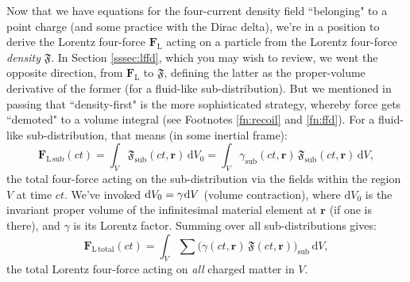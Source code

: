 \documentclass[12pt]{article}
\renewcommand{\vv}[1]{\mathbf{#1}}
\newcommand{\dd}[1]{\mathrm{d}#1}
\begin{document}
Now that we have equations for the four-current density field ``belonging" to a point charge (and some practice with the Dirac delta), we're in a position to derive the Lorentz four-force $\vv F_{\mathrm{L}}$ acting on a particle from the Lorentz four-force \emph{density} $\bm{\mathfrak{F}}$. In Section \ref{sssec:lffd}, which you may wish to review, we went the opposite direction, from $\vv F_{\mathrm{L}}$ to $\bm{\mathfrak{F}}$, defining the latter as the proper-volume derivative of the former (for a fluid-like sub-distribution). But we mentioned in passing that ``density-first" is the more sophisticated strategy, whereby force gets ``demoted" to a volume integral (see Footnotes \ref{fn:recoil} and \ref{fn:ffd}). For a fluid-like sub-distribution, that means (in some inertial frame):
\begin{equation*}
\vv F_{\mathrm{L \, sub}} (ct) = \int_{V} \bm{\mathfrak{F}}_{\mathrm{sub}} (ct, \vv r) \, \dd V_0 = \int_{V} \gamma_{\mathrm{sub}} (ct, \vv r) \, \bm{\mathfrak{F}}_{\mathrm{sub}} (ct, \vv r) \, \dd V,
\end{equation*}
the total four-force acting on the sub-distribution via the fields within the region $V$ at time $ct$. We've invoked $\dd V_0 = \gamma \mkern1mu \dd V$ (volume contraction), where $\dd V_0$ is the invariant proper volume of the infinitesimal material element at $\vv r$ (if one is there), and $\gamma$ is its Lorentz factor. Summing over all sub-distributions gives:
\begin{equation*}
\vv F_{\mathrm{L \, total}} (ct) = \int_{V} \sum \Big( \gamma(ct, \vv r) \, \bm{\mathfrak{F}} (ct, \vv r) \Big)_{\mathrm{sub}} \, \dd V ,
\end{equation*}
the total Lorentz four-force acting on \emph{all} charged matter in $V$.
\end{document}

